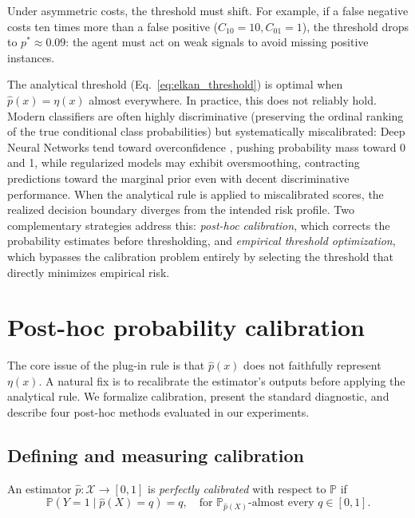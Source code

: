 Under asymmetric costs, the threshold must shift. For example, if a false negative costs ten times more than a false positive ($C_{10}=10, C_{01}=1$), the threshold drops to $p^* \approx 0.09$: the agent must act on weak signals to avoid missing positive instances.

The analytical threshold (Eq.~\ref{eq:elkan_threshold}) is optimal when $\hat{p}(x) = \eta(x)$ almost everywhere. In practice, this does not reliably hold. Modern classifiers are often highly discriminative (preserving the ordinal ranking of the true conditional class probabilities) but systematically miscalibrated: Deep Neural Networks tend toward overconfidence \citep{guo2017calibration}, pushing probability mass toward 0 and 1, while regularized models may exhibit oversmoothing, contracting predictions toward the marginal prior even with decent discriminative performance. When the analytical rule is applied to miscalibrated scores, the realized decision boundary diverges from the intended risk profile. Two complementary strategies address this: \textit{post-hoc calibration}, which corrects the probability estimates before thresholding, and \textit{empirical threshold optimization}, which bypasses the calibration problem entirely by selecting the threshold that directly minimizes empirical risk.

\section{Post-hoc probability calibration}\label{sec:calibration}

The core issue of the plug-in rule is that $\hat{p}(x)$ does not faithfully represent $\eta(x)$. A natural fix is to recalibrate the estimator's outputs before applying the analytical rule. We formalize calibration, present the standard diagnostic, and describe four post-hoc methods evaluated in our experiments.

\subsection{Defining and measuring calibration}

\begin{definition}\label{def:calibration}
An estimator $\hat{p} \colon \mathcal{X} \to [0,1]$ is \emph{perfectly calibrated} with respect to $\mathbb{P}$ if
\begin{equation}\label{eq:perfect_calibration}
    \mathbb{P}(Y = 1 \mid \hat{p}(X) = q) = q, \quad \text{for } \mathbb{P}_{\hat{p}(X)}\text{-almost every } q \in [0,1].
\end{equation}
\end{definition}

